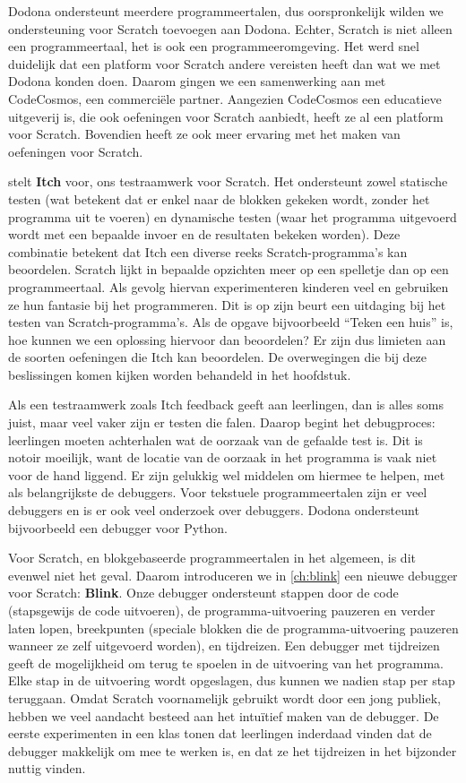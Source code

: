 \documentclass[main]{subfiles}
\begin{document}
Dodona ondersteunt meerdere programmeertalen, dus oorspronkelijk wilden we ondersteuning voor Scratch toevoegen aan Dodona.
Echter, Scratch is niet alleen een programmeertaal, het is ook een programmeeromgeving.
Het werd snel duidelijk dat een platform voor Scratch andere vereisten heeft dan wat we met Dodona konden doen.
Daarom gingen we een samenwerking aan met CodeCosmos, een commerciële partner.
Aangezien CodeCosmos een educatieve uitgeverij is, die ook oefeningen voor Scratch aanbiedt, heeft ze al een platform voor Scratch.
Bovendien heeft ze ook meer ervaring met het maken van oefeningen voor Scratch.

 stelt \textbf{Itch} voor, ons testraamwerk voor Scratch.
Het ondersteunt zowel statische testen (wat betekent dat er enkel naar de blokken gekeken wordt, zonder het programma uit te voeren) en dynamische testen (waar het programma uitgevoerd wordt met een bepaalde invoer en de resultaten bekeken worden).
Deze combinatie betekent dat Itch een diverse reeks Scratch-programma's kan beoordelen.
Scratch lijkt in bepaalde opzichten meer op een spelletje dan op een programmeertaal.
Als gevolg hiervan experimenteren kinderen veel en gebruiken ze hun fantasie bij het programmeren.
Dit is op zijn beurt een uitdaging bij het testen van Scratch-programma's.
Als de opgave bijvoorbeeld ``Teken een huis'' is, hoe kunnen we een oplossing hiervoor dan beoordelen?
Er zijn dus limieten aan de soorten oefeningen die Itch kan beoordelen.
De overwegingen die bij deze beslissingen komen kijken worden behandeld in het hoofdstuk.

Als een testraamwerk zoals Itch feedback geeft aan leerlingen, dan is alles soms juist, maar veel vaker zijn er testen die falen.
Daarop begint het debugproces: leerlingen moeten achterhalen wat de oorzaak van de gefaalde test is.
Dit is notoir moeilijk, want de locatie van de oorzaak in het programma is vaak niet voor de hand liggend.
Er zijn gelukkig wel middelen om hiermee te helpen, met als belangrijkste de debuggers.
Voor tekstuele programmeertalen zijn er veel debuggers en is er ook veel onderzoek over debuggers.
Dodona ondersteunt bijvoorbeeld een debugger voor Python.

Voor Scratch, en blokgebaseerde programmeertalen in het algemeen, is dit evenwel niet het geval.
Daarom introduceren we in \cref{ch:blink} een nieuwe debugger voor Scratch: \textbf{Blink}.
Onze debugger ondersteunt stappen door de code (stapsgewijs de code uitvoeren), de programma-uitvoering pauzeren en verder laten lopen, breekpunten (speciale blokken die de programma-uitvoering pauzeren wanneer ze zelf uitgevoerd worden), en tijdreizen.
Een debugger met tijdreizen geeft de mogelijkheid om terug te spoelen in de uitvoering van het programma.
Elke stap in de uitvoering wordt opgeslagen, dus kunnen we nadien stap per stap teruggaan.
Omdat Scratch voornamelijk gebruikt wordt door een jong publiek, hebben we veel aandacht besteed aan het intuïtief maken van de debugger.
De eerste experimenten in een klas tonen dat leerlingen inderdaad vinden dat de debugger makkelijk om mee te werken is, en dat ze het tijdreizen in het bijzonder nuttig vinden.
\end{document}
